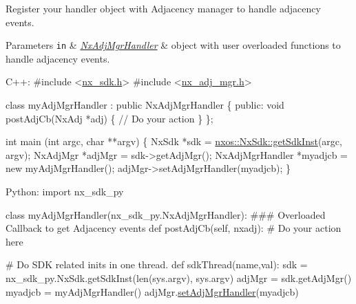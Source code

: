 Register your handler object with Adjacency manager to handle adjacency events. 
\begin{DoxyParams}[1]{Parameters}
\mbox{\tt in}  & {\em \mbox{\hyperlink{classnxos_1_1_nx_adj_mgr_handler}{Nx\+Adj\+Mgr\+Handler}}} & object with user overloaded functions to handle adjacency events.\\
\hline
\end{DoxyParams}

\begin{DoxyCode}
C++:
\textcolor{preprocessor}{   #include <\mbox{\hyperlink{nx__sdk_8h}{nx\_sdk.h}}>}
\textcolor{preprocessor}{   #include <\mbox{\hyperlink{nx__adj__mgr_8h}{nx\_adj\_mgr.h}}>}

   \textcolor{keyword}{class }myAdjMgrHandler : \textcolor{keyword}{public} NxAdjMgrHandler \{
      \textcolor{keyword}{public}:
         \textcolor{keywordtype}{void} postAdjCb(NxAdj *adj) \{
              \textcolor{comment}{// Do your action}
         \}
   \};

   \textcolor{keywordtype}{int}  main (\textcolor{keywordtype}{int} argc, \textcolor{keywordtype}{char} **argv)
   \{
        NxSdk    *sdk = \mbox{\hyperlink{classnxos_1_1_nx_sdk_a5050e2d26c40744b4fc7862068a83f39}{nxos::NxSdk::getSdkInst}}(argc, argv);
        NxAdjMgr *adjMgr = sdk->getAdjMgr();
        NxAdjMgrHandler *myadjcb = \textcolor{keyword}{new} myAdjMgrHandler();
        adjMgr->setAdjMgrHandler(myadjcb);
   \}

Python:
   \textcolor{keyword}{import} nx\_sdk\_py

   \textcolor{keyword}{class }myAdjMgrHandler(nx\_sdk\_py.NxAdjMgrHandler):
\textcolor{preprocessor}{   ### Overloaded Callback to get Adjacency events}
         def postAdjCb(self, nxadj):
\textcolor{preprocessor}{             # Do your action here}

\textcolor{preprocessor}{   # Do SDK related inits in one thread.}
   def sdkThread(name,val):
       sdk = nx\_sdk\_py.NxSdk.getSdkInst(len(sys.argv), sys.argv)
       adjMgr = sdk.getAdjMgr()
       myadjcb = myAdjMgrHandler()
       adjMgr.\mbox{\hyperlink{classnxos_1_1_nx_adj_mgr_afc37b95ddfe24357cfd0803cad8feb74}{setAdjMgrHandler}}(myadjcb)
\end{DoxyCode}
 \mbox{\label{classnxos_1_1_nx_adj_mgr_a9937a382ff7f6eb789b728a2512e37f3}} 
